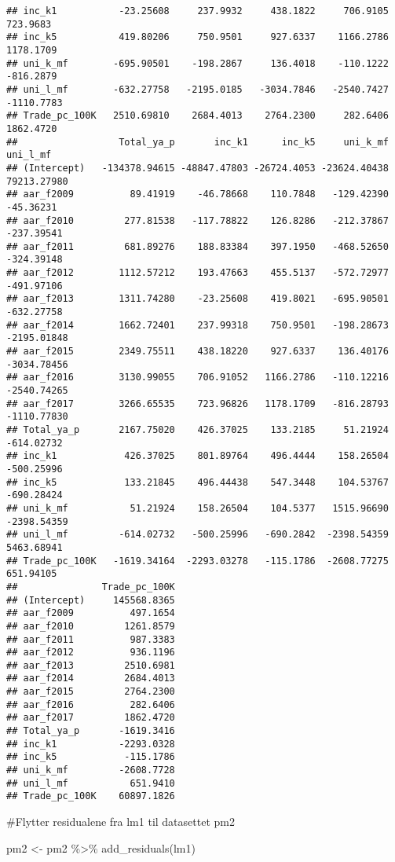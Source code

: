 \documentclass[
]{article}
\newenvironment{Shaded}{\begin{snugshade}}{\end{snugshade}}
\newcommand{\FunctionTok}[1]{\textcolor[rgb]{0.00,0.00,0.00}{#1}}
\newcommand{\NormalTok}[1]{#1}
\newcommand{\OtherTok}[1]{\textcolor[rgb]{0.56,0.35,0.01}{#1}}
\newcommand{\SpecialCharTok}[1]{\textcolor[rgb]{0.00,0.00,0.00}{#1}}
\begin{document}
\begin{verbatim}
## inc_k1           -23.25608     237.9932     438.1822     706.9105     723.9683
## inc_k5           419.80206     750.9501     927.6337    1166.2786    1178.1709
## uni_k_mf        -695.90501    -198.2867     136.4018    -110.1222    -816.2879
## uni_l_mf        -632.27758   -2195.0185   -3034.7846   -2540.7427   -1110.7783
## Trade_pc_100K   2510.69810    2684.4013    2764.2300     282.6406    1862.4720
##                  Total_ya_p       inc_k1      inc_k5     uni_k_mf    uni_l_mf
## (Intercept)   -134378.94615 -48847.47803 -26724.4053 -23624.40438 79213.27980
## aar_f2009          89.41919    -46.78668    110.7848   -129.42390   -45.36231
## aar_f2010         277.81538   -117.78822    126.8286   -212.37867  -237.39541
## aar_f2011         681.89276    188.83384    397.1950   -468.52650  -324.39148
## aar_f2012        1112.57212    193.47663    455.5137   -572.72977  -491.97106
## aar_f2013        1311.74280    -23.25608    419.8021   -695.90501  -632.27758
## aar_f2014        1662.72401    237.99318    750.9501   -198.28673 -2195.01848
## aar_f2015        2349.75511    438.18220    927.6337    136.40176 -3034.78456
## aar_f2016        3130.99055    706.91052   1166.2786   -110.12216 -2540.74265
## aar_f2017        3266.65535    723.96826   1178.1709   -816.28793 -1110.77830
## Total_ya_p       2167.75020    426.37025    133.2185     51.21924  -614.02732
## inc_k1            426.37025    801.89764    496.4444    158.26504  -500.25996
## inc_k5            133.21845    496.44438    547.3448    104.53767  -690.28424
## uni_k_mf           51.21924    158.26504    104.5377   1515.96690 -2398.54359
## uni_l_mf         -614.02732   -500.25996   -690.2842  -2398.54359  5463.68941
## Trade_pc_100K   -1619.34164  -2293.03278   -115.1786  -2608.77275   651.94105
##               Trade_pc_100K
## (Intercept)     145568.8365
## aar_f2009          497.1654
## aar_f2010         1261.8579
## aar_f2011          987.3383
## aar_f2012          936.1196
## aar_f2013         2510.6981
## aar_f2014         2684.4013
## aar_f2015         2764.2300
## aar_f2016          282.6406
## aar_f2017         1862.4720
## Total_ya_p       -1619.3416
## inc_k1           -2293.0328
## inc_k5            -115.1786
## uni_k_mf         -2608.7728
## uni_l_mf           651.9410
## Trade_pc_100K    60897.1826
\end{verbatim}

\#Flytter residualene fra lm1 til datasettet pm2

\begin{Shaded}
\begin{Highlighting}[]
\NormalTok{pm2 }\OtherTok{\textless{}{-}}\NormalTok{ pm2 }\SpecialCharTok{\%\textgreater{}\%}
  \FunctionTok{add\_residuals}\NormalTok{(lm1)}
\end{Highlighting}
\end{Shaded}
\end{document}
